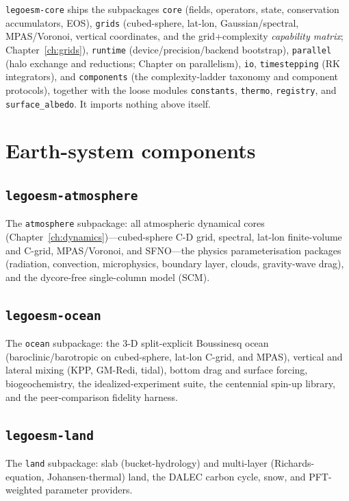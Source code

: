 \documentclass[11pt,twoside]{report}
\begin{document}
\texttt{legoesm-core} ships the subpackages \texttt{core} (fields, operators,
state, conservation accumulators, EOS), \texttt{grids} (cubed-sphere, lat-lon,
Gaussian/spectral, MPAS/Voronoi, vertical coordinates, and the grid+complexity
\emph{capability matrix}; Chapter~\ref{ch:grids}), \texttt{runtime}
(device/precision/backend bootstrap), \texttt{parallel} (halo exchange and
reductions; Chapter on parallelism), \texttt{io}, \texttt{timestepping}
(RK integrators), and \texttt{components} (the complexity-ladder taxonomy and
component protocols), together with the loose modules \texttt{constants},
\texttt{thermo}, \texttt{registry}, and \texttt{surface\_albedo}.  It imports
nothing above itself.

\section{Earth-system components}
\label{sec:arch-components}

\subsection{\texttt{legoesm-atmosphere}}
The \texttt{atmosphere} subpackage: all atmospheric dynamical cores
(Chapter~\ref{ch:dynamics})---cubed-sphere C-D grid, spectral, lat-lon
finite-volume and C-grid, MPAS/Voronoi, and SFNO---the physics parameterisation
packages (radiation, convection, microphysics, boundary layer, clouds,
gravity-wave drag), and the dycore-free single-column model (SCM).

\subsection{\texttt{legoesm-ocean}}
The \texttt{ocean} subpackage: the 3-D split-explicit Boussinesq ocean
(baroclinic/barotropic on cubed-sphere, lat-lon C-grid, and MPAS), vertical and
lateral mixing (KPP, GM-Redi, tidal), bottom drag and surface forcing,
biogeochemistry, the idealized-experiment suite, the centennial spin-up library,
and the peer-comparison fidelity harness.

\subsection{\texttt{legoesm-land}}
The \texttt{land} subpackage: slab (bucket-hydrology) and multi-layer
(Richards-equation, Johansen-thermal) land, the DALEC carbon cycle, snow, and
PFT-weighted parameter providers.
\end{document}
